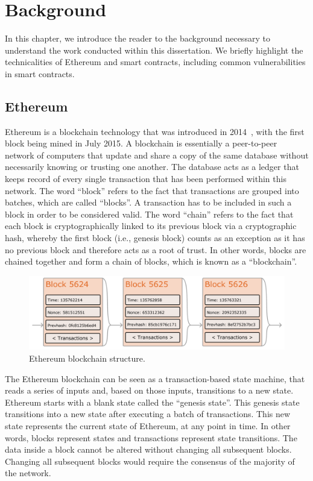 
\chapter{Background}
\label{chap:background}
    In this chapter, we introduce the reader to the background necessary to understand the work conducted within this dissertation.
    We briefly highlight the technicalities of Ethereum and smart contracts, including common vulnerabilities in smart contracts.

\section{Ethereum}
    Ethereum is a blockchain technology that was introduced in 2014~\cite{wood2014ethereum}, with the first block being mined in July 2015.
    A blockchain is essentially a peer-to-peer network of computers that update and share a copy of the same database without necessarily knowing or trusting one another.
    The database acts as a ledger that keeps record of every single transaction that has been performed within this network.
    The word “block” refers to the fact that transactions are grouped into batches, which are called “blocks”.
    A transaction has to be included in such a block in order to be considered valid.
    The word “chain” refers to the fact that each block is cryptographically linked to its previous block via a cryptographic hash, whereby the first block (i.e., genesis block) counts as an exception as it has no previous block and therefore acts as a root of trust.
    In other words, blocks are chained together and form a chain of blocks, which is known as a “blockchain”.
    
    \begin{figure}
        \centering
        \includegraphics[width=\textwidth]{figures/ethereum-blocks.png}
        \caption{Ethereum blockchain structure.}
        \label{fig:ethereumBlockchainStructure}
    \end{figure}

    The Ethereum blockchain can be seen as a transaction-based state machine, that reads a series of inputs and, based on those inputs, transitions to a new state.
    Ethereum starts with a blank state called the “genesis state”.
    This genesis state transitions into a new state after executing a batch of transactions.
    This new state represents the current state of Ethereum, at any point in time. In other words, blocks represent states and transactions represent state transitions.
    The data inside a block cannot be altered without changing all subsequent blocks.
    Changing all subsequent blocks would require the consensus of the majority of the network.

